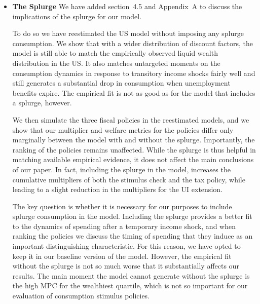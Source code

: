 \begin{itemize}
	\item \textbf{The Splurge} We have added section~4.5 and Appendix~A to discuss the implications of the splurge for our model. 
	
	To do so we have reestimated the US model without imposing any splurge consumption. We show that with a wider distribution of discount factors, the model is still able to match the empirically observed liquid wealth distribution in the US. It also matches untargeted moments on the consumption dynamics in response to transitory income shocks fairly well and still generates a substantial drop in consumption when unemployment benefits expire. The empirical fit is not as good as for the model that includes a splurge, however.  
	
	We then simulate the three fiscal policies in the reestimated models, and we show that our multiplier and welfare metrics for the policies differ only marginally between the model with and without the splurge. Importantly, the ranking of the policies remains unaffected. While the splurge is thus helpful in matching available empirical evidence, it does not affect the main conclusions of our paper. In fact, including the splurge in the model, increases the cumulative multipliers of both the stimulus check and the tax policy, while leading to a slight reduction in the multipliers for the UI extension. 
	
	The key question is whether it is necessary for our purposes to include splurge consumption in the model. Including the splurge provides a better fit to the dynamics of spending after a temporary income shock, and when ranking the policies we discuss the timing of spending that they induce as an important distinguishing characteristic. For this reason, we have opted to keep it in our baseline version of the model. However, the empirical fit without the splurge is not so much worse that it substantially affects our results. The main moment the model cannot generate without the splurge is the high MPC for the wealthiest quartile, which is not so important for our evaluation of consumption stimulus policies. 
	
	

\end{itemize}
